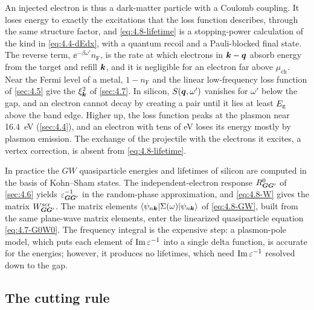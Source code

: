 An injected electron is thus a dark-matter particle with a Coulomb coupling. It loses energy to exactly the excitations that the loss function describes, through the same structure factor, and \cref{eq:4.8-lifetime} is a stopping-power calculation of the kind in \cref{eq:4.4-dEdx}, with a quantum recoil and a Pauli-blocked final state. The reverse term, $\ee^{-\beta\omega'}n_{\mathrm{F}}$, is the rate at which electrons in $\bm{k} - \bm{q}$ absorb energy from the target and refill $\bm{k}$, and it is negligible for an electron far above $\mu_{\mathrm{ch}}$. Near the Fermi level of a metal, $1 - n_{\mathrm{F}}$ and the linear low-frequency loss function of \cref{sec:4.5} give the $\xi_{\bm{k}}^2$ of \cref{sec:4.7}. In silicon, $S(\bm{q},\omega')$ vanishes for $\omega'$ below the gap, and an electron cannot decay by creating a pair until it lies at least $E_{\mathrm{g}}$ above the band edge. Higher up, the loss function peaks at the plasmon near \SI{16.4}{eV} (\cref{sec:4.4}), and an electron with tens of eV loses its energy mostly by plasmon emission. The exchange of the projectile with the electrons it excites, a vertex correction, is absent from \cref{eq:4.8-lifetime}.

In practice the $GW$ quasiparticle energies and lifetimes of silicon are computed in the basis of Kohn--Sham states. The independent-electron response $R^0_{\bm{G}\bm{G}'}$ of \cref{sec:4.6} yields $\varepsilon^{-1}_{\bm{G}\bm{G}'}$ in the random-phase approximation, and \cref{eq:4.8-W} gives the matrix $W^{\mathrm{scr}}_{\bm{G}\bm{G}'}$. The matrix elements $\langle\psi_{n\bm{k}}|\Sigma(\omega)|\psi_{n\bm{k}}\rangle$ of \cref{eq:4.8-GW}, built from the same plane-wave matrix elements, enter the linearized quasiparticle equation \cref{eq:4.7-G0W0}. The frequency integral is the expensive step: a plasmon-pole model, which puts each element of $\operatorname{Im}\varepsilon^{-1}$ into a single delta function, is accurate for the energies; however, it produces no lifetimes, which need $\operatorname{Im}\varepsilon^{-1}$ resolved down to the gap.

\subsection{The cutting rule}

